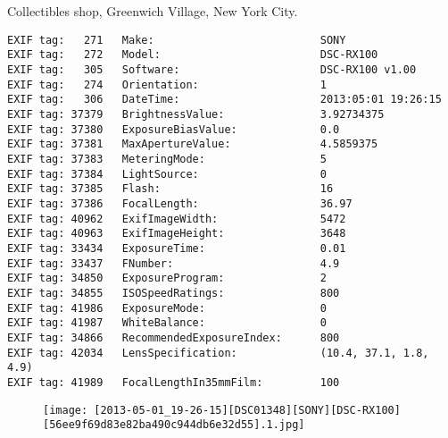 \section{\protect{}}
\noindent Collectibles shop, Greenwich Village, New York City.
\noindent
\begin{lstlisting}
EXIF tag:   271   Make:                          SONY
EXIF tag:   272   Model:                         DSC-RX100
EXIF tag:   305   Software:                      DSC-RX100 v1.00
EXIF tag:   274   Orientation:                   1
EXIF tag:   306   DateTime:                      2013:05:01 19:26:15
EXIF tag: 37379   BrightnessValue:               3.92734375
EXIF tag: 37380   ExposureBiasValue:             0.0
EXIF tag: 37381   MaxApertureValue:              4.5859375
EXIF tag: 37383   MeteringMode:                  5
EXIF tag: 37384   LightSource:                   0
EXIF tag: 37385   Flash:                         16
EXIF tag: 37386   FocalLength:                   36.97
EXIF tag: 40962   ExifImageWidth:                5472
EXIF tag: 40963   ExifImageHeight:               3648
EXIF tag: 33434   ExposureTime:                  0.01
EXIF tag: 33437   FNumber:                       4.9
EXIF tag: 34850   ExposureProgram:               2
EXIF tag: 34855   ISOSpeedRatings:               800
EXIF tag: 41986   ExposureMode:                  0
EXIF tag: 41987   WhiteBalance:                  0
EXIF tag: 34866   RecommendedExposureIndex:      800
EXIF tag: 42034   LensSpecification:             (10.4, 37.1, 1.8, 4.9)
EXIF tag: 41989   FocalLengthIn35mmFilm:         100

\end{lstlisting}
\clearpage
\begin{figure}
\raggedleft
\texttt{[image: [2013-05-01\_19-26-15][DSC01348][SONY][DSC-RX100][56ee9f69d83e82ba490c944db6e32d55].1.jpg]}
\end{figure}


\clearpage
